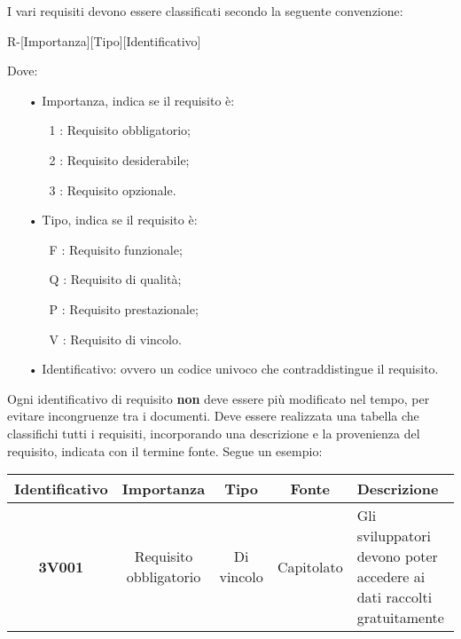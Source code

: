 I vari requisiti devono essere classificati secondo la seguente {convenzione}:
\begin{center}
R-[Importanza][Tipo][Identificativo]
\end{center}
Dove:
\begin{itemize}
\item[•] Importanza, indica se il requisito è:
\begin{itemize}
\item[1]: Requisito obbligatorio;
\item[2]: Requisito desiderabile;
\item[3]: Requisito opzionale.
\end{itemize}
\item[•] Tipo, indica se il requisito è:
\begin{itemize}
\item[F]: Requisito funzionale;
\item[Q]: Requisito di qualità;
\item[P]: Requisito prestazionale;
\item[V]: Requisito di vincolo.
\end{itemize}
\item[•] Identificativo: ovvero un codice univoco che contraddistingue il requisito.
\end{itemize}
Ogni identificativo di requisito \textbf{non} deve essere più modificato nel tempo, per evitare incongruenze tra i documenti.
Deve essere realizzata una tabella che classifichi tutti i requisiti, incorporando una descrizione e la provenienza del requisito, indicata con il termine fonte.
Segue un esempio:
\begin{table}[H]
\centering
\begin{tabularx}{\linewidth}{| c | c | c | c | Z |}
\hline
\textbf{Identificativo} & \textbf{Importanza} & \textbf{Tipo} & \textbf{Fonte} & \textbf{Descrizione} \\
\hline
\textbf{3V001} & Requisito obbligatorio & Di vincolo & Capitolato & Gli sviluppatori devono poter accedere ai dati raccolti gratuitamente \\
\hline
\end{tabularx}
\end{table}
